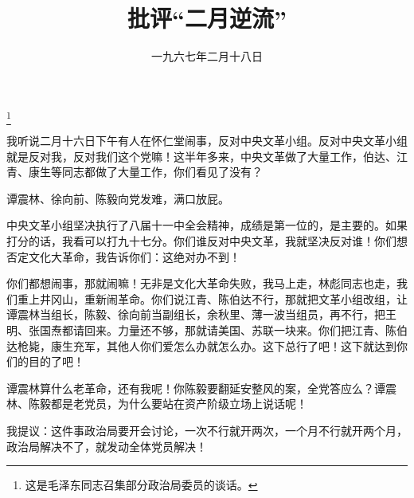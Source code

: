 
\title{批评“二月逆流”}
\date{一九六七年二月十八日}
\thanks{这是毛泽东同志召集部分政治局委员的谈话。}
\maketitle


我听说二月十六日下午有人在怀仁堂闹事，反对中央文革小组。反对中央文革小组就是反对我，反对我们这个党嘛！这半年多来，中央文革做了大量工作，伯达、江青、康生等同志都做了大量工作，你们看见了没有？

谭震林、徐向前、陈毅向党发难，满口放屁。

中央文革小组坚决执行了八届十一中全会精神，成绩是第一位的，是主要的。如果打分的话，我看可以打九十七分。你们谁反对中央文革，我就坚决反对谁！你们想否定文化大革命，我告诉你们：这绝对办不到！

你们都想闹事，那就闹嘛！无非是文化大革命失败，我马上走，林彪同志也走，我们重上井冈山，重新闹革命。你们说江青、陈伯达不行，那就把文革小组改组，让谭震林当组长，陈毅、徐向前当副组长，余秋里、薄一波当组员，再不行，把王明、张国焘都请回来。力量还不够，那就请美国、苏联一块来。你们把江青、陈伯达枪毙，康生充军，其他人你们爱怎么办就怎么办。这下总行了吧！这下就达到你们的目的了吧！

谭震林算什么老革命，还有我呢！你陈毅要翻延安整风的案，全党答应么？谭震林、陈毅都是老党员，为什么要站在资产阶级立场上说话呢！

我提议：这件事政治局要开会讨论，一次不行就开两次，一个月不行就开两个月，政治局解决不了，就发动全体党员解决！

